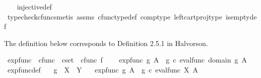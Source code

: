 \begin{isabellebody}
%
\isadelimproof
\ \ %
\endisadelimproof
%
\isatagproof
{}\isamarkupfalse%
\ injective{\isacharunderscore}{\kern0pt}def\isanewline
\ \ \isamarkupfalse%
\ {\isacharparenleft}{\kern0pt}typecheck{\isacharunderscore}{\kern0pt}cfuncs{\isacharcomma}{\kern0pt}metis\ assms\ cfunc{\isacharunderscore}{\kern0pt}type{\isacharunderscore}{\kern0pt}def\ comp{\isacharunderscore}{\kern0pt}type\ left{\isacharunderscore}{\kern0pt}cart{\isacharunderscore}{\kern0pt}proj{\isacharunderscore}{\kern0pt}type\ is{\isacharunderscore}{\kern0pt}empty{\isacharunderscore}{\kern0pt}def{\isacharparenright}{\kern0pt}%
\endisatagproof
{\isafoldproof}%
%
\isadelimproof
%
\endisadelimproof
%
\isadelimdocument
%
\endisadelimdocument
%
\isatagdocument
%
\isamarkuptrue%
%
\endisatagdocument
{\isafolddocument}%
%
\isadelimdocument
%
\endisadelimdocument
%
\begin{isamarkuptext}%
The definition below corresponds to Definition 2.5.1 in Halvorson.%
\end{isamarkuptext}\isamarkuptrue%
\isamarkupfalse%
\ exp{\isacharunderscore}{\kern0pt}func\ {\isacharcolon}{\kern0pt}{\isacharcolon}{\kern0pt}\ {\isachardoublequoteopen}cfunc\ {\isasymRightarrow}\ cset\ {\isasymRightarrow}\ cfunc{\isachardoublequoteclose}\ {\isacharparenleft}{\kern0pt}{\isachardoublequoteopen}{\isacharparenleft}{\kern0pt}{\isacharunderscore}{\kern0pt}{\isacharparenright}{\kern0pt}\isactrlbsup {\isacharunderscore}{\kern0pt}\isactrlesup \isactrlsub f{\isachardoublequoteclose}\ {\isacharbrackleft}{\kern0pt}{}{}{}{\isacharcomma}{\kern0pt}{}{}{}{\isacharbrackright}{\kern0pt}{}{}{}{\isacharparenright}{\kern0pt}\ \isanewline
\ \ {\isachardoublequoteopen}exp{\isacharunderscore}{\kern0pt}func\ g\ A\ {\isacharequal}{\kern0pt}\ {\isacharparenleft}{\kern0pt}g\ {\isasymcirc}\isactrlsub c\ eval{\isacharunderscore}{\kern0pt}func\ {\isacharparenleft}{\kern0pt}domain\ g{\isacharparenright}{\kern0pt}\ A{\isacharparenright}{\kern0pt}\isactrlsup {\isasymsharp}{\isachardoublequoteclose}\isanewline
\isanewline
{}\isamarkupfalse%
\ exp{\isacharunderscore}{\kern0pt}func{\isacharunderscore}{\kern0pt}def{}{\isacharcolon}{\kern0pt}\isanewline
\ \ \ {\isachardoublequoteopen}g\ {\isacharcolon}{\kern0pt}\ X\ {\isasymrightarrow}\ Y{\isachardoublequoteclose}\isanewline
\ \ \ {\isachardoublequoteopen}exp{\isacharunderscore}{\kern0pt}func\ g\ A\ {\isacharequal}{\kern0pt}\ {\isacharparenleft}{\kern0pt}g\ {\isasymcirc}\isactrlsub c\ eval{\isacharunderscore}{\kern0pt}func\ X\ A{\isacharparenright}{\kern0pt}\isactrlsup {\isasymsharp}{\isachardoublequoteclose}\isanewline

\end{isabellebody}
